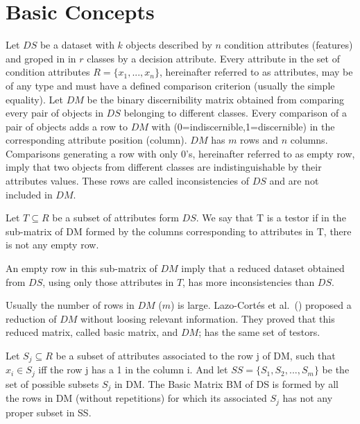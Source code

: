 \documentclass[citeauthoryear]{llncs}
\begin{document}
\section{Basic Concepts}
%
	Let $DS$ be a dataset with $k$ objects described by $n$ condition attributes (features) and groped in
	in $r$ classes by a decision attribute. Every attribute in the set of condition attributes 
	$R=\lbrace x_1,...,x_n \rbrace$, hereinafter referred to as attributes, may be of any type and must
	have a defined comparison criterion (usually the simple equality). Let $DM$ be the binary discernibility
	matrix obtained from comparing every pair of objects in $DS$ belonging to different classes. Every 
	comparison of a pair of objects adds a row to $DM$ with (0=indiscernible,1=discernible) in the corresponding 
	attribute position (column). $DM$ has $m$ rows and $n$ columns. Comparisons generating a row with only 
	0's, hereinafter referred to as empty row, imply that two objects from different classes are indistinguishable 
	by their attributes values. These rows are called inconsistencies of $DS$ and are not included in $DM$.
	
	\begin{definition}\label{def:testor}
		Let $T \subseteq R$ be a subset of attributes form $DS$. We say that T is a testor if in the sub-matrix
		of DM formed by the columns corresponding to attributes in T, there is not any empty row.
	\end{definition}
	
	An empty row in this sub-matrix of $DM$ imply that a reduced dataset obtained from $DS$, using only those 
	attributes in $T$, has more inconsistencies than $DS$. 	
	
	Usually the number of rows in $DM$ ($m$) is large. Lazo-Cort\'es et al.~(\cite{Lazo2001}) proposed a reduction
	of $DM$ without loosing relevant information. They proved that this reduced matrix, called basic matrix, and
	$DM$; has the same set of testors. 
	
	\begin{definition} \label{def:BM}
		Let $S_{j} \subseteq R$ be a subset of attributes associated to the row j of DM, such that $x_i \in S_{j}$
		iff the row j has a 1 in the column i. And let $SS=\lbrace S_1, S_2,...,S_m  \rbrace$ be the set of
		possible subsets $S_{j}$ in DM. The Basic Matrix BM of DS is formed by all the rows in DM (without
		repetitions) for which its associated $S_{j}$ has not any proper subset in SS.
	\end{definition}
	
\end{document}
